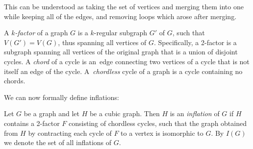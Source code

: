 \documentclass[12pt, twoside]{book}
\begin{document}
This can be understood as taking the set of vertices and merging them into one while keeping all of the edges, and removing loops which arose after merging.

A \emph{$k$-factor} of a graph $G$ is a $k$-regular subgraph $G'$ of $G$, such that $V(G')=V(G)$, thus spanning all vertices of $G$. Specifically, a 2-factor is a subgraph spanning all vertices of the original graph that is a union of disjoint cycles. A \textit{chord} of a cycle is an~edge connecting two vertices of a cycle that is not itself an edge of the cycle. A~\textit{chordless} cycle of a graph is a cycle containing no chords.

We can now formally define inflations:

\begin{definition}
	Let $G$ be a graph and let $H$ be a cubic graph. Then $H$ is an \emph{inflation} of $G$ if $H$ contains a 2-factor $F$ consisting of chordless cycles, such that the graph obtained from $H$ by contracting each cycle of $F$ to a vertex is isomorphic to $G$. By $I(G)$ we denote the set of all inflations of $G$.
\end{definition}
\end{document}
